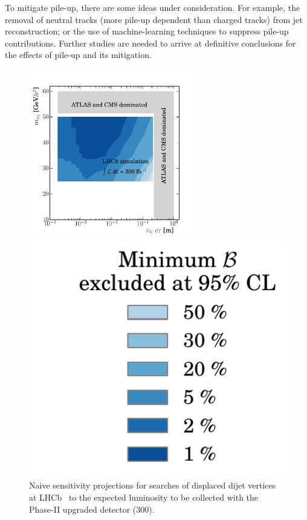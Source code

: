 To mitigate pile-up, there are some ideas under consideration. For example, the removal of neutral tracks (more pile-up dependent than charged tracks) from jet reconstruction; or the use of machine-learning techniques to suppress pile-up contributions. Further studies are needed to arrive at definitive conclusions for the effects of pile-up and its mitigation. 

\begin{figure}[t]
  \includegraphics[width=0.65\textwidth]{figures/LLP_compare_PIV_4_HL.pdf}
\begin{minipage}[t]{0.26\textwidth}
  \vspace{-6.cm}
  \hspace{-0.7cm}
\includegraphics[width=1.2\textwidth]{figures/LLP_compare_legend.pdf}
\end{minipage}
  \caption{Naive sensitivity projections for searches of displaced dijet vertices at LHCb~\cite{Aaij:2017mic} to the expected luminosity to be collected with the Phase-II upgraded detector (300\invfb).}
  \label{fig:dvsearches_hllhc}
\end{figure}

